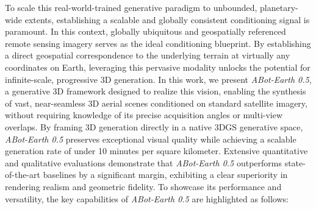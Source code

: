 \documentclass{llmxive}
\providecommand{\method}{\textit{ABot-Earth 0.5}\xspace}
\begin{document}
To scale this real-world-trained generative paradigm to unbounded, planetary-wide extents, establishing a scalable and globally consistent conditioning signal is paramount. In this context, globally ubiquitous and geospatially referenced remote sensing imagery serves as the ideal conditioning blueprint. By establishing a direct geospatial correspondence to the underlying terrain at virtually any coordinates on Earth, leveraging this pervasive modality unlocks the potential for infinite-scale, progressive 3D generation. In this work, we present \method{}, a generative 3D framework designed to realize this vision, enabling the synthesis of vast, near-seamless 3D aerial scenes conditioned on standard satellite imagery, without requiring knowledge of its precise acquisition angles or multi-view overlaps. By framing 3D generation directly in a native 3DGS generative space, \method{} preserves exceptional visual quality while achieving a scalable generation rate of under 10 minutes per square kilometer. Extensive quantitative and qualitative evaluations demonstrate that \method{} outperforms state-of-the-art baselines by a significant margin, exhibiting a clear superiority in rendering realism and geometric fidelity. To showcase its performance and versatility, the key capabilities of \method{} are highlighted as follows:
\end{document}

